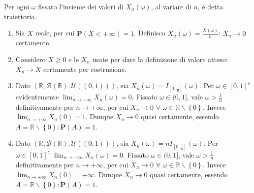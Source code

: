 \documentclass{article}
\begin{document}
Per ogni $\omega $ fissato l'insieme dei valori di $X_{n}\left( \omega
\right) $, al variare di $n$, \`{e} detta traiettoria.

\begin{enumerate}
\item Sia $X$ reale, per cui $\mathbf{P}\left( X<+\infty \right) =1$.
Definisco $X_{n}\left( \omega \right) =\frac{X\left( \omega \right) }{n}$: $%
X_{n}\rightarrow 0$ certamente.

\item Considero $X\geq 0$ e le $X_{n}$ usate per dare la definizione di
valore atteso: $X_{n}\rightarrow X$ certamente per costruzione.

\item Dato $\left( 
\mathbb{R}
,\mathcal{B}\left( 
\mathbb{R}
\right) ,\mathcal{U}\left( \left( 0,1\right) \right) \right) $, sia $%
X_{n}\left( \omega \right) =I_{\left[ 0,\frac{1}{n}\right] }\left( \omega
\right) $. Per $\omega \in \left[ 0,1\right] ^{c}$ evidentemente $%
\lim_{n\rightarrow +\infty }X_{n}\left( \omega \right) =0$. Fissato $\omega
\in (0,1]$, vale $\omega >\frac{1}{n}$ definitivamente per $n\rightarrow
+\infty $, per cui $X_{n}\rightarrow 0$ $\forall $ $\omega \in 
\mathbb{R}
\backslash \left\{ 0\right\} $. Invece $\lim_{n\rightarrow +\infty
}X_{n}\left( 0\right) =1$. Dunque $X_{n}\rightarrow 0$ quasi certamente,
essendo $A=%
\mathbb{R}
\backslash \left\{ 0\right\} :\mathbf{P}\left( A\right) =1$.

\item Dato $\left( 
\mathbb{R}
,\mathcal{B}\left( 
\mathbb{R}
\right) ,\mathcal{U}\left( \left( 0,1\right) \right) \right) $, sia $%
X_{n}\left( \omega \right) =nI_{\left[ 0,\frac{1}{n}\right] }\left( \omega
\right) $. Per $\omega \in \left[ 0,1\right] ^{c}$ $\lim_{n\rightarrow
+\infty }X_{n}\left( \omega \right) =0$. Fissato $\omega \in (0,1]$, vale $%
\omega >\frac{1}{n}$ definitivamente per $n\rightarrow +\infty $, per cui $%
X_{n}\rightarrow 0$ $\forall $ $\omega \in 
\mathbb{R}
\backslash \left\{ 0\right\} $. Invece $\lim_{n\rightarrow +\infty
}X_{n}\left( 0\right) =+\infty $. Dunque $X_{n}\rightarrow 0$ quasi
certamente, essendo $A=%
\mathbb{R}
\backslash \left\{ 0\right\} :\mathbf{P}\left( A\right) =1$.


\end{enumerate}
\end{document}
